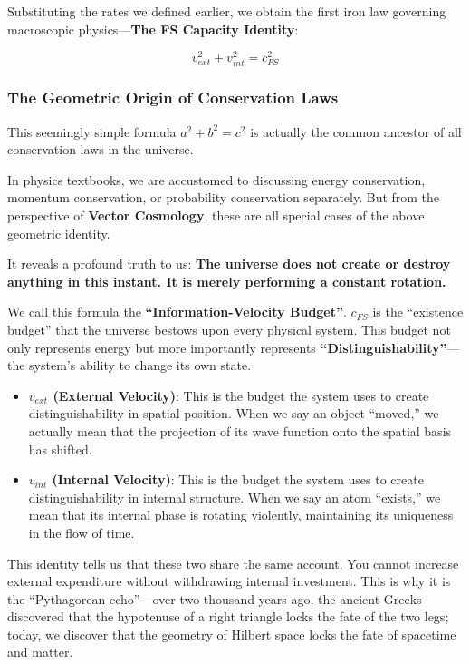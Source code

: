 Substituting the rates we defined earlier, we obtain the first iron law governing macroscopic physics---\textbf{The FS Capacity Identity}:

\[v_{ext}^2 + v_{int}^2 = c_{FS}^2\]

\subsubsection{The Geometric Origin of Conservation Laws}

This seemingly simple formula $a^2 + b^2 = c^2$ is actually the common ancestor of all conservation laws in the universe.

In physics textbooks, we are accustomed to discussing energy conservation, momentum conservation, or probability conservation separately. But from the perspective of \textbf{Vector Cosmology}, these are all special cases of the above geometric identity.

It reveals a profound truth to us: \textbf{The universe does not create or destroy anything in this instant. It is merely performing a constant rotation.}

We call this formula the \textbf{``Information-Velocity Budget''}. $c_{FS}$ is the ``existence budget'' that the universe bestows upon every physical system. This budget not only represents energy but more importantly represents \textbf{``Distinguishability''}---the system's ability to change its own state.

\begin{itemize}
\item \textbf{$v_{ext}$ (External Velocity)}: This is the budget the system uses to create distinguishability in spatial position. When we say an object ``moved,'' we actually mean that the projection of its wave function onto the spatial basis has shifted.

\item \textbf{$v_{int}$ (Internal Velocity)}: This is the budget the system uses to create distinguishability in internal structure. When we say an atom ``exists,'' we mean that its internal phase is rotating violently, maintaining its uniqueness in the flow of time.
\end{itemize}

This identity tells us that these two share the same account. You cannot increase external expenditure without withdrawing internal investment. This is why it is the ``Pythagorean echo''---over two thousand years ago, the ancient Greeks discovered that the hypotenuse of a right triangle locks the fate of the two legs; today, we discover that the geometry of Hilbert space locks the fate of spacetime and matter.

